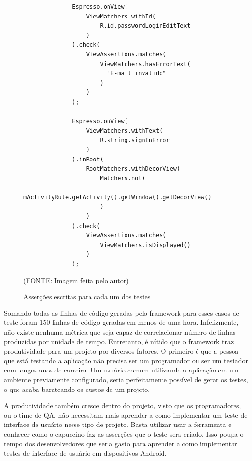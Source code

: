 \documentclass[
    12pt,       %
    openright,      %
    twoside,      %
    a4paper,      %
    english,      %
    french,       %
    spanish,      %
    brazil,       %
    ]{abntex2}
\begin{document}
      \begin{figure}[htpb]
          \begin{lstlisting}
              Espresso.onView(
                  ViewMatchers.withId(
                      R.id.passwordLoginEditText
                  )
              ).check(
                  ViewAssertions.matches(
                      ViewMatchers.hasErrorText(
                        "E-mail invalido"
                      )
                  )
              );

              Espresso.onView(
                  ViewMatchers.withText(
                      R.string.signInError
                  )
              ).inRoot(
                  RootMatchers.withDecorView(
                      Matchers.not(
                          mActivityRule.getActivity().getWindow().getDecorView()
                      )
                  )
              ).check(
                  ViewAssertions.matches(
                      ViewMatchers.isDisplayed()
                  )
              );
          \end{lstlisting}
          \caption{\label{fig:passaro}Asserções escritas para cada um dos testes}\vspace{-1.2\baselineskip}
          \centering
          \begin{center}(FONTE: Imagem feita pelo autor)\end{center}
      \end{figure}

      Somando todas as linhas de código geradas pelo framework para esses casos de teste foram 150 linhas
      de código geradas em menos de uma hora. Infelizmente, não existe nenhuma métrica que seja capaz de
      correlacionar número de linhas produzidas por unidade de tempo. Entretanto, é nítido que o framework
      traz produtividade para um projeto por diversos fatores. O primeiro é que a pessoa que está testando
      a aplicação não precisa ser um programador ou ser um testador com longos anos de carreira. Um usuário
      comum utilizando a aplicação em um ambiente previamente configurado, seria perfeitamente possível
      de gerar os testes, o que acaba barateando os custos de um projeto.

      A produtividade também cresce dentro do projeto, visto que os programadores, ou o time de QA, não
      necessitam mais aprender a como implementar um teste de interface de usuário nesse tipo de projeto.
      Basta utilizar usar a ferramenta e conhecer como o capuccino faz as asserções que o teste será criado.
      Isso poupa o tempo dos desenvolvedores que seria gasto para aprender a como implementar testes de
      interface de usuário em dispositivos Android.
\end{document}
